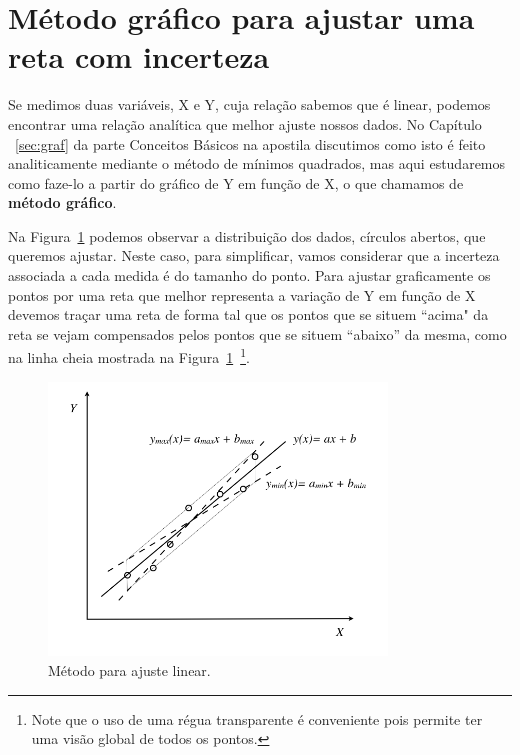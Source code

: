 \section{Método gráfico para ajustar uma reta com incerteza}\label{retagrafico}



Se medimos duas variáveis, X e Y, cuja relação sabemos que é linear, podemos encontrar uma relação analítica que melhor ajuste nossos dados. No Capítulo ~\ref{sec:graf}  da parte Conceitos Básicos na apostila discutimos como isto é feito analiticamente mediante o método de mínimos quadrados, mas aqui estudaremos como faze-lo a partir do gráfico de Y em função de X, o que chamamos de {\bf método gráfico}.

Na Figura~\ref{fig:graflin} podemos observar a distribuição dos dados, círculos abertos, que queremos ajustar. Neste caso, para simplificar, vamos considerar que a incerteza associada a cada medida é do tamanho do ponto.  Para ajustar graficamente os pontos  por uma reta que melhor representa a variação de Y em função de X devemos traçar uma reta de forma tal que os pontos que se situem ``acima" da reta se vejam compensados pelos pontos que se situem ``abaixo'' da mesma, como na linha cheia mostrada na Figura~\ref{fig:graflin}~\footnote{Note que o uso de uma régua transparente é conveniente pois permite ter uma visão global de todos os pontos.}. 
\begin{figure}[!h]
\vspace{-0.4cm}
\begin{center}
\includegraphics[width=9cm]{fig/GraficoLinGrafico}
\caption{\label{fig:graflin} Método para ajuste linear.}
\vspace{-0.4cm}
\end{center}
\end{figure}



